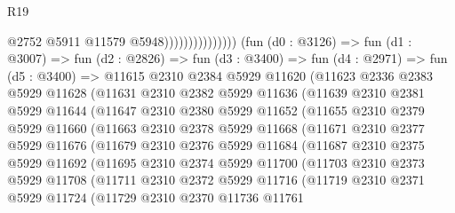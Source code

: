 \begin{lexlean}{R19}
\begin{coremodule}
                                      @2752
                                      @5911
                                      @11579
                                      @5948)))))))))))))))
        (fun (d0 : @3126) =>
        fun (d1 : @3007) =>
        fun (d2 : @2826) =>
        fun (d3 : @3400) =>
        fun (d4 : @2971) =>
        fun (d5 : @3400) =>
        @11615
          @2310
          @2384
          @5929
          @11620
          (@11623
            @2336
            @2383
            @5929
            @11628
            (@11631
              @2310
              @2382
              @5929
              @11636
              (@11639
                @2310
                @2381
                @5929
                @11644
                (@11647
                  @2310
                  @2380
                  @5929
                  @11652
                  (@11655
                    @2310
                    @2379
                    @5929
                    @11660
                    (@11663
                      @2310
                      @2378
                      @5929
                      @11668
                      (@11671
                        @2310
                        @2377
                        @5929
                        @11676
                        (@11679
                          @2310
                          @2376
                          @5929
                          @11684
                          (@11687
                            @2310
                            @2375
                            @5929
                            @11692
                            (@11695
                              @2310
                              @2374
                              @5929
                              @11700
                              (@11703
                                @2310
                                @2373
                                @5929
                                @11708
                                (@11711
                                  @2310
                                  @2372
                                  @5929
                                  @11716
                                  (@11719
                                    @2310
                                    @2371
                                    @5929
                                    @11724
                                    (@11729
                                      @2310
                                      @2370
                                      @11736
                                      @11761

\end{coremodule}
\end{lexlean}
